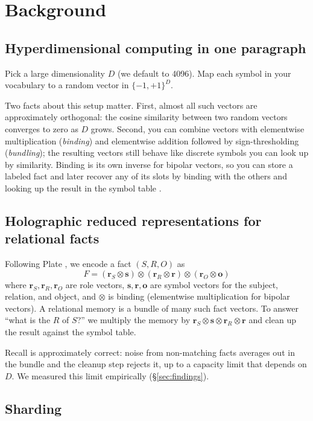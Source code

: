 \documentclass[11pt]{article}
\begin{document}
\section{Background}

\subsection{Hyperdimensional computing in one paragraph}

Pick a large dimensionality $D$ (we default to 4096). Map each symbol
in your vocabulary to a random vector in $\{-1, +1\}^D$.

Two facts about this setup matter. First, almost all such vectors are
approximately orthogonal: the cosine similarity between two random
vectors converges to zero as $D$ grows. Second, you can combine
vectors with elementwise multiplication (\emph{binding}) and
elementwise addition followed by sign-thresholding (\emph{bundling});
the resulting vectors still behave like discrete symbols you can
look up by similarity. Binding is its own inverse for bipolar
vectors, so you can store a labeled fact and later recover any of
its slots by binding with the others and looking up the result in
the symbol table \cite{kanerva2009, plate1995}.

\subsection{Holographic reduced representations for relational facts}

Following Plate \cite{plate1995}, we encode a fact
$(S, R, O)$ as
\[
F = (\mathbf{r}_S \otimes \mathbf{s}) \otimes (\mathbf{r}_R \otimes \mathbf{r}) \otimes (\mathbf{r}_O \otimes \mathbf{o})
\]
where $\mathbf{r}_S, \mathbf{r}_R, \mathbf{r}_O$ are role vectors,
$\mathbf{s}, \mathbf{r}, \mathbf{o}$ are symbol vectors for the
subject, relation, and object, and $\otimes$ is binding (elementwise
multiplication for bipolar vectors). A relational memory is a bundle
of many such fact vectors. To answer ``what is the $R$ of $S$?'' we
multiply the memory by $\mathbf{r}_S \otimes \mathbf{s} \otimes \mathbf{r}_R \otimes \mathbf{r}$
and clean up the result against the symbol table.

Recall is approximately correct: noise from non-matching facts
averages out in the bundle and the cleanup step rejects it, up to a
capacity limit that depends on $D$. We measured this limit
empirically (\S\ref{sec:findings}).

\subsection{Sharding}
\end{document}
